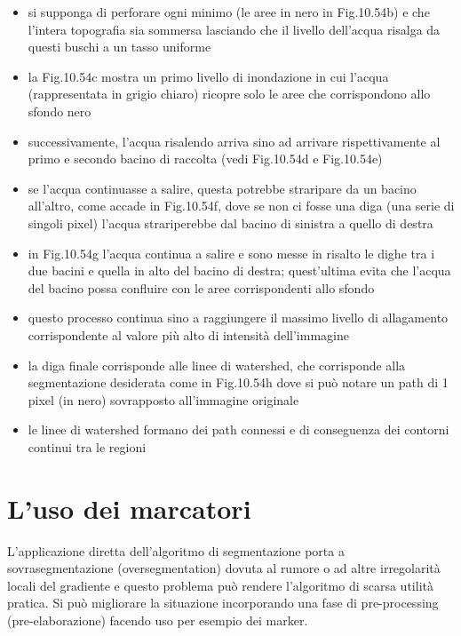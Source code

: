 \begin{itemize}
	\item si supponga di perforare ogni minimo (le aree in nero in Fig.10.54b) e che l'intera topografia sia sommersa lasciando che il livello dell'acqua risalga da questi buschi a un tasso uniforme
	
	\item la Fig.10.54c mostra un primo livello di inondazione in cui l'acqua (rappresentata in grigio chiaro) ricopre solo le aree che corrispondono allo sfondo nero
	
	\item successivamente, l'acqua risalendo arriva sino ad arrivare rispettivamente al primo e secondo bacino di raccolta (vedi Fig.10.54d e Fig.10.54e)
	
	\item se l'acqua continuasse a salire, questa potrebbe straripare da un bacino all'altro, come accade in Fig.10.54f, dove se non ci fosse una diga (una serie di singoli pixel) l'acqua strariperebbe dal bacino di sinistra a quello di destra
	
	\item in Fig.10.54g l'acqua continua a salire e sono messe in risalto le dighe tra i due bacini e quella in alto del bacino di destra; quest'ultima evita che l'acqua del bacino possa confluire con le aree corrispondenti allo sfondo
	
	\item questo processo continua sino a raggiungere il massimo livello di allagamento corrispondente al valore più alto di intensità dell'immagine
	
	\item la diga finale corrisponde alle linee di watershed, che corrisponde alla segmentazione desiderata come in Fig.10.54h dove si può notare un path di 1 pixel (in nero) sovrapposto all'immagine originale
	
	\item le linee di watershed formano dei path connessi e di conseguenza dei contorni continui tra le regioni
\end{itemize}

\section{L'uso dei marcatori}
L'applicazione diretta dell'algoritmo di segmentazione porta a sovrasegmentazione (oversegmentation) dovuta al rumore o ad altre irregolarità locali del gradiente e questo problema può rendere l'algoritmo di scarsa utilità pratica. Si può migliorare la situazione incorporando una fase di pre-processing (pre-elaborazione) facendo uso per esempio dei marker.

